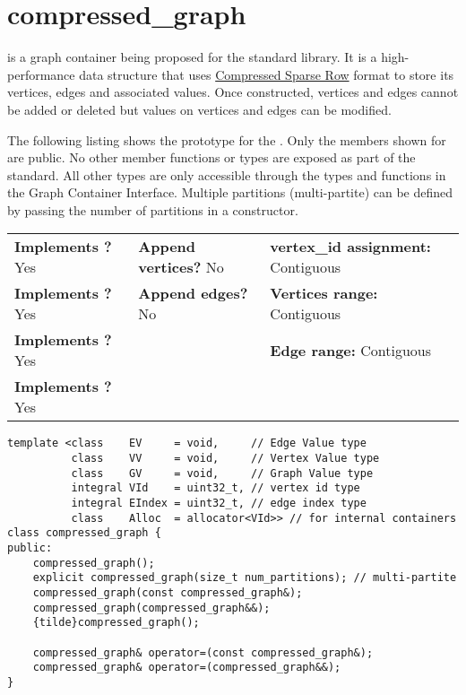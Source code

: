 
\clearpage

\section{compressed\_graph}
 is a graph container being proposed for the standard library. It is a high-performance data structure that 
uses \href{https://en.wikipedia.org/wiki/Sparse_matrix#Compressed_sparse_row_\%28CSR\%2C_CRS_or_Yale_format\%29}{Compressed Sparse Row} 
format to store its vertices, edges and associated values. Once constructed, vertices and edges cannot be added or deleted but values 
on vertices and edges can be modified.

The following listing shows the prototype for the . Only the members shown for  are public. 
No other member functions or types are exposed as part of the standard. All other types are only accessible through the types and functions 
in the Graph Container Interface. Multiple partitions (multi-partite) can be defined by passing the number of partitions in a constructor.

\begin{table}[h]
    \setcellgapes{3pt}
    \makegapedcells
    \centering
    \begin{tabular}{|P{0.37\textwidth}|P{0.25\textwidth}|P{0.38\textwidth}|}
    \hline
    \textbf{Implements ?} Yes & \textbf{Append vertices?} No & \textbf{vertex\_id assignment:} Contiguous\\
    \textbf{Implements ?} Yes & \textbf{Append edges?} No & \textbf{Vertices range:} Contiguous \\
    \textbf{Implements ?} Yes &  & \textbf{Edge range:} Contiguous \\
    \textbf{Implements ?} Yes &  & \\
    \hline
    \end{tabular}
    \label{tab:compressed_graph_summary}
\end{table}

\begin{lstlisting}
template <class    EV     = void,     // Edge Value type
          class    VV     = void,     // Vertex Value type
          class    GV     = void,     // Graph Value type
          integral VId    = uint32_t, // vertex id type
          integral EIndex = uint32_t, // edge index type
          class    Alloc  = allocator<VId>> // for internal containers
class compressed_graph {
public:
    compressed_graph();
    explicit compressed_graph(size_t num_partitions); // multi-partite
    compressed_graph(const compressed_graph&);
    compressed_graph(compressed_graph&&);
    {tilde}compressed_graph();

    compressed_graph& operator=(const compressed_graph&);
    compressed_graph& operator=(compressed_graph&&);
}
\end{lstlisting}


